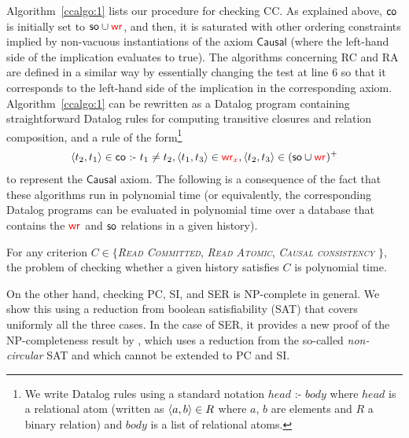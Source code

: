 Algorithm~\ref{ccalgo:1} lists our procedure for checking CC. As explained above, $\CO$ is initially set to $\so\cup \wro$, and then, it is saturated with other ordering constraints implied by non-vacuous instantiations of the axiom $\mathsf{Causal}$ (where the left-hand side of the implication evaluates to true). The algorithms concerning RC and RA are defined in a similar way by essentially changing the test at line 6 so that it corresponds to the left-hand side of the implication in the corresponding axiom. Algorithm~\ref{ccalgo:1} can be rewritten as a Datalog program containing straightforward Datalog rules for computing transitive closures and relation composition, and a rule of the form\footnote{We write Datalog rules using a standard notation $\mathit{head}\text{ :- }\mathit{body}$ where $\mathit{head}$ is a relational atom (written as $\tup{a,b}\in R$ where $a$, $b$ are elements and $R$ a binary relation) and $\mathit{body}$ is a list of relational atoms.}
\begin{align*}
\tup{\tr_2, \tr_1} \in \CO \text{ :- } \tr_1\neq\tr_2, \tup{\tr_1,\tr_3}\in \wro[\xvar], \tup{\tr_2,\tr_3}\in (\so\cup\wro)^+
\end{align*}
to represent the $\mathsf{Causal}$ axiom.
The following is a consequence of the fact that these algorithms run in polynomial time (or equivalently, the corresponding Datalog programs can be evaluated in polynomial time over a database that contains the $\wro$ and $\so$ relations in a given history).%

\begin{theorem}
For any criterion $C \in \{$\emph{\textsc{Read Committed}}, \emph{\textsc{Read Atomic}}, \emph{\textsc{Causal consistency}} $\}$, 
the problem of checking whether a given history satisfies $C$ %
is polynomial time.
\end{theorem}

On the other hand, checking PC, SI, and SER is NP-complete in general. We show this using a reduction from boolean satisfiability (SAT) that covers uniformly all the three cases. In the case of SER, it provides a new proof of the NP-completeness result by \cite{DBLP:journals/jacm/Papadimitriou79b}, which uses a reduction from the so-called \emph{non-circular} SAT and which cannot be extended to PC and SI.

